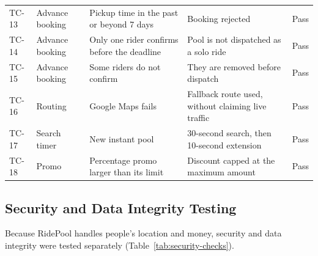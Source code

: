 \begin{table}[H]
\begin{tabularx}{\textwidth}{@{}lp{2.2cm}LLc@{}}
    TC-13 & Advance booking & Pickup time in the past or beyond 7 days & Booking rejected & Pass \\
    TC-14 & Advance booking & Only one rider confirms before the deadline & Pool is not dispatched as a solo ride & Pass \\
    TC-15 & Advance booking & Some riders do not confirm & They are removed before dispatch & Pass \\
    TC-16 & Routing & Google Maps fails & Fallback route used, without claiming live traffic & Pass \\
    TC-17 & Search timer & New instant pool & 30-second search, then 10-second extension & Pass \\
    TC-18 & Promo & Percentage promo larger than its limit & Discount capped at the maximum amount & Pass \\
    \bottomrule
  \end{tabularx}
\end{table}

\subsection{Security and Data Integrity Testing}
\label{subsec:security-testing}

Because RidePool handles people's location and money, security and data
integrity were tested separately (Table~\ref{tab:security-checks}).

